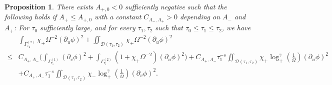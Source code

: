\documentclass[10pt, reqno]{amsart}
\newtheorem{proposition}[theorem]{Proposition}
\theoremstyle{definition}
\theoremstyle{remark}
\numberwithin{equation}{section}
\newcommand{\rd}{\partial}
\newcommand{\bb}{\Big}
\newcommand{\0}{\emptyset}
\newcommand{\Gmm}{\Gamma}
\newcommand{\Omg}{\Omega}
\newcommand{\calD}{\mathcal D}
\newcommand{\f}{\frac}
\begin{document}
\begin{proposition} \label{prop:intr:red-shift:EH}  
There exists $A_{+,0}<0$ sufficiently negative such that the following holds if $A_+\leq A_{+,0}$ with a constant $C_{A_-,A_+}>0$ depending on $A_-$ and $A_+$: For $\tau_0$ sufficiently large, and for every $\tau_{1}, \tau_{2}$ such that $\tau_0 \leq \tau_{1} \leq \tau_{2}$, we have
\begin{equation} \label{eq:intr:red-shift:EH}
\begin{split}
	&\int_{\Gmm^{(2)}_{\tau_{2}}} \chi_{+} \Omg^{-2}(\rd_{u} \phi)^{2}
	+ \iint_{\calD(\tau_{1}, \tau_{2})} \chi_{+} \Omg^{-2} (\rd_{u} \phi)^{2} \\
	\leq &C_{A_+,A_-} \bb( \int_{\Gmm^{(1)}_{\tau_{1}}} (\rd_{v} \phi)^{2} + \int_{\Gmm^{(2)}_{\tau_{1}}} (1 + \chi_{+} \Omg^{-2}) (\rd_{u} \phi)^{2} \bb)+C_{A_+,A_-}\tau_1^{-s}\iint_{\calD(\tau_{1}, \tau_{2})} \chi_+\log_+^{\gamma}(\f{1}{\Omg})(\rd_u\phi)^2\\
	&+C_{A_+,A_-}\tau_1^{-s}\iint_{\calD(\tau_{1}, \tau_{2})} \chi_-\log_+^{\gamma}(\f{1}{\Omg})(\rd_v\phi)^2.
\end{split}
\end{equation}
\end{proposition}
\end{document}
